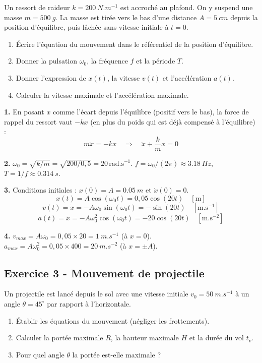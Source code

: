 \documentclass[12pt,a4paper]{article}
\begin{document}
\begin{boiteexercice}
Un ressort de raideur $k = \qty{200}{N.m^{-1}}$ est accroché au plafond. On y suspend une masse $m = \qty{500}{g}$. La masse est tirée vers le bas d'une distance $A = \qty{5}{cm}$ depuis la position d'équilibre, puis lâchée sans vitesse initiale à $t=0$.
\begin{enumerate}
  \item Écrire l'équation du mouvement dans le référentiel de la position d'équilibre.
  \item Donner la pulsation $\omega_0$, la fréquence $f$ et la période $T$.
  \item Donner l'expression de $x(t)$, la vitesse $v(t)$ et l'accélération $a(t)$.
  \item Calculer la vitesse maximale et l'accélération maximale.
\end{enumerate}
\end{boiteexercice}

\begin{boitecorrige}
\textbf{1.} En posant $x$ comme l'écart depuis l'équilibre (positif vers le bas), la force de rappel du ressort vaut $-kx$ (en plus du poids qui est déjà compensé à l'équilibre) :
\[
m\ddot{x} = -kx \quad \Rightarrow \quad \ddot{x} + \frac{k}{m}x = 0
\]

\textbf{2.} $\omega_0 = \sqrt{k/m} = \sqrt{200/0{,}5} = 20\,\text{rad.s}^{-1}$.
$f = \omega_0/(2\pi) \approx \qty{3.18}{Hz}$, $T = 1/f \approx \qty{0.314}{s}$.

\textbf{3.} Conditions initiales : $x(0) = A = \qty{0.05}{m}$ et $\dot{x}(0) = 0$.
\[
x(t) = A\cos(\omega_0 t) = 0{,}05\cos(20t) \quad [\text{m}]
\]
\[
v(t) = \dot{x} = -A\omega_0\sin(\omega_0 t) = -\sin(20t) \quad [\text{m.s}^{-1}]
\]
\[
a(t) = \ddot{x} = -A\omega_0^2\cos(\omega_0 t) = -20\cos(20t) \quad [\text{m.s}^{-2}]
\]

\textbf{4.} $v_{max} = A\omega_0 = 0{,}05\times20 = \qty{1}{m.s^{-1}}$ (à $x=0$).
$a_{max} = A\omega_0^2 = 0{,}05\times400 = \qty{20}{m.s^{-2}}$ (à $x=\pm A$).
\end{boitecorrige}

\subsection*{Exercice 3 - Mouvement de projectile \niveau{\moyen}}

\begin{boiteexercice}
Un projectile est lancé depuis le sol avec une vitesse initiale $v_0 = \qty{50}{m.s^{-1}}$ à un angle $\theta = 45^\circ $ par rapport à l'horizontale.
\begin{enumerate}
  \item Établir les équations du mouvement (négliger les frottements).
  \item Calculer la portée maximale $R$, la hauteur maximale $H$ et la durée du vol $t_v$.
  \item Pour quel angle $\theta$ la portée est-elle maximale ?
\end{enumerate}
\end{boiteexercice}
\end{document}
